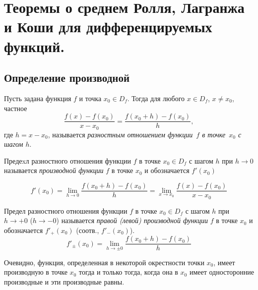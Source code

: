 \chapter{Теоремы о среднем Ролля, Лагранжа и Коши для дифференцируемых функций.}\label{chapter4}

\section{Определение производной}

Пусть задана функция $f$ и точка $x_0\in D_f$. Тогда для любого $x \in D_f$, $x\ne x_0$, частное
\begin{equation}\label{ya3e1}
\frac{f(x)-f(x_0)}{x-x_0}=\frac{f(x_0+h)-f(x_0)}{h}, 
\end{equation}
где $h=x-x_0$, называется \textit{разностным отношением функции~$f$ в точке~$x_0$ с шагом $h$}.

\begin{defn}
\label{ya3d1}
Предеxл разностного отношения функции $f$ в точке $x_0 \in D_f$ с шагом $h$ при $h \to 0$ называется \textit{производной функции} $f$ в точке $x_0$ и обозначается $f'(x_0)$

\begin{equation}\label{ya3e2}
f'(x_0)=\lim_{h\to 0}\limits\frac{f(x_0+h)-f(x_0)}{h}=\lim_{x\to x_0}\limits \frac{f(x)-f(x_0)}{x-x_0}
\end{equation}

\end{defn}
\begin{defn} Предел разностного отношения функции $f$ в точке $x_0 \in D_f$ с шагом $h$ при $h \to +0 $ ($h \to -0$) называется \textit{правой (левой) производной функции} $f$ в точке $x_0$ и обозначается $f'_+(x_0)$ (соотв., $f'_-(x_0)$).
\begin{equation}\label{ya3e3}
f'_\pm(x_0)=\lim_{h\to \pm0}\limits\frac{f(x_0+h)-f(x_0)}{h}
\end{equation}
\end{defn}

Очевидно, функция, определенная в некоторой окрестности точки $x_0$, имеет производную в точке $x_0$ тогда и только тогда, когда она в $x_0$ имеет односторонние производные и эти производные равны.

